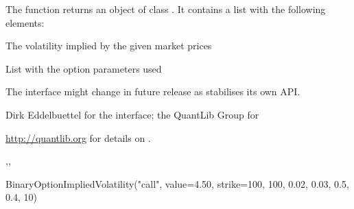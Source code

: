 \begin{Value}
The  function returns an object
of class . It contains a list with the
following elements:
\begin{ldescription}
\item[\code{impliedVol}] The volatility implied by the given market prices
\item[\code{parameters}] List with the option parameters used
\end{ldescription}
\end{Value}
\begin{Note}\relax
The interface might change in future release as 
stabilises its own API.
\end{Note}
\begin{Author}\relax
Dirk Eddelbuettel  for the \R{} interface;
the QuantLib Group for 
\end{Author}
\begin{References}\relax
\url{http://quantlib.org} for details on .
\end{References}
\begin{SeeAlso}\relax
{},,
\end{SeeAlso}
\begin{Examples}
\begin{ExampleCode}
BinaryOptionImpliedVolatility("call", value=4.50, strike=100, 100, 0.02, 0.03, 0.5, 0.4, 10)
\end{ExampleCode}
\end{Examples}

